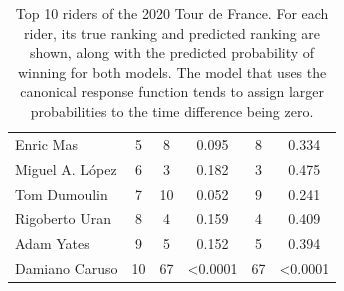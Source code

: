 \documentclass[aos,preprint]{imsart}
\begin{document}
\begin{table}[ht]
\begin{tabular}{lc|cc|cc}
Enric Mas                       & 5                                                                                 & 8                & 0.095                                                                      & 8                & 0.334                                                                      \\
Miguel A. López                 & 6                                                                                 & 3                & 0.182                                                                      & 3                & 0.475                                                                      \\
Tom Dumoulin                    & 7                                                                                 & 10               & 0.052                                                                      & 9                & 0.241                                                                      \\
Rigoberto Uran                  & 8                                                                                 & 4                & 0.159                                                                      & 4                & 0.409                                                                      \\
Adam Yates                      & 9                                                                                 & 5                & 0.152                                                                      & 5                & 0.394                                                                      \\
Damiano Caruso                  & 10                                                                                & 67               & \textless{}0.0001                                                          & 67               & \textless{}0.0001                                                          \\ \hline
\end{tabular}
\caption{Top 10 riders of the 2020 Tour de France. For each rider, its true ranking and predicted ranking are shown, along with the predicted probability of winning for both models. The model that uses the canonical response function tends to assign larger probabilities to the time difference being zero.}
\label{table:results}
\end{table}
\end{document}
